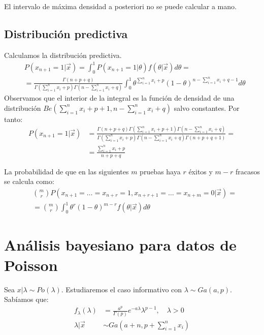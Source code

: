 \begin{note}
    El intervalo de máxima densidad a posteriori no se puede calcular a mano.
\end{note}

\subsection*{Distribución predictiva}
Calculamos la distribución predictiva.
\begin{align*}
     & P(x_{n+1} = 1|\vec{x}) = \int_0^1 P(x_{n+1} = 1|\theta)f(\theta|\vec{x})d\theta =                                                                                        \\
     & = \frac{\Gamma(n+p+q)}{\Gamma(\sum_{i=1}^n x_i + p)\Gamma(n - \sum_{i=1}^n x_i + q)} \int_0^1 \theta^{\sum_{i=1}^n x_i + p}(1-\theta)^{n - \sum_{i=1}^n x_i +q-1}d\theta
\end{align*}
Observamos que el interior de la integral es la función de densidad de una distribución $Be(\sum_{i=1}^n x_i + p+1, n - \sum_{i=1}^n x_i + q)$ salvo constantes.
Por tanto:
\begin{align*}
    P(x_{n+1} = 1|\vec{x}) & = \frac{\Gamma(n+p+q)\Gamma(\sum_{i=1}^n x_i+p+1)\Gamma(n - \sum_{i=1}^n x_i + q)}{\Gamma(\sum_{i=1}^n x_i + p)\Gamma(n - \sum_{i=1}^n x_i + q)\Gamma(n+p+q+1)} = \\
                           & = \frac{\sum_{i=1}^n x_i+p}{n+p+q}
\end{align*}

La probabilidad de que en las siguientes $m$ pruebas haya $r$ éxitos y $m-r$ fracasos se calcula como:
\begin{align*}
     & \binom{m}{r}P(x_{n+1} = \dots = x_{n+r} = 1, x_{n+r+1} = \dots = x_{n+m} = 0|\vec{x}) = \\
     & = \binom{m}{r} \int_0^1 \theta^r(1-\theta)^{m-r}f(\theta|\vec{x})d\theta
\end{align*}

\section{Análisis bayesiano para datos de Poisson}
Sea $x|\lambda \sim Po(\lambda)$.
Estudiaremos el caso informativo con $\lambda \sim Ga(a, p)$.
Sabíamos que:
\begin{align*}
    f_\lambda(\lambda) & = \frac{a^p}{\Gamma(p)} e^{-a\lambda}\lambda^{p-1}, \quad \lambda > 0 \\
    \lambda|\vec{x}    & \sim Ga(a+n, p+\sum_{i=1}^n x_i)
\end{align*}

